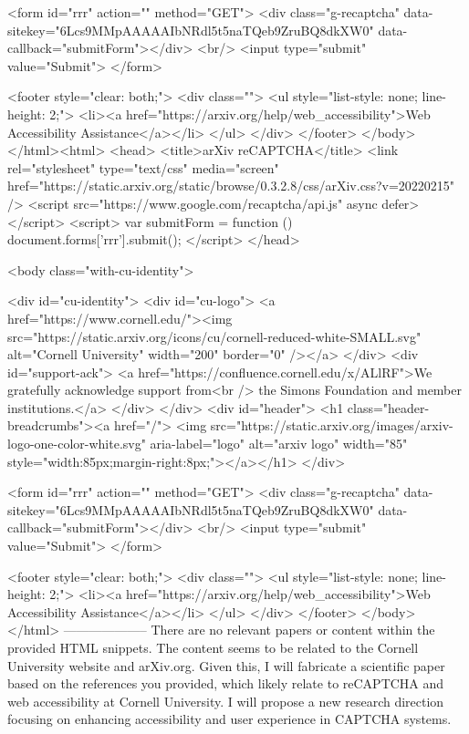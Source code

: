        <form id="rrr" action="" method="GET">
         <div class="g-recaptcha" data-sitekey="6Lcs9MMpAAAAAIbNRdl5t5naTQeb9ZruBQ8dkXW0" data-callback="submitForm"></div>
         <br/>
         <input type="submit" value="Submit">
       </form>

       <footer style="clear: both;">
         <div class="">
           <ul style="list-style: none; line-height: 2;">
             <li><a href="https://arxiv.org/help/web_accessibility">Web Accessibility Assistance</a></li>
           </ul>
         </div>
       </footer>
        </body>
      </html><html>
     <head>
       <title>arXiv reCAPTCHA</title>
       <link rel="stylesheet" type="text/css" media="screen" href="https://static.arxiv.org/static/browse/0.3.2.8/css/arXiv.css?v=20220215" />
       <script src="https://www.google.com/recaptcha/api.js" async defer></script>
       <script>
         var submitForm = function () {
             document.forms['rrr'].submit();
         }
       </script>
     </head>

     <body class="with-cu-identity">

       <div id="cu-identity">
         <div id="cu-logo">
           <a href="https://www.cornell.edu/"><img src="https://static.arxiv.org/icons/cu/cornell-reduced-white-SMALL.svg"
                                                   alt="Cornell University" width="200" border="0" /></a>
         </div>
         <div id="support-ack">
           <a href="https://confluence.cornell.edu/x/ALlRF">We gratefully acknowledge support from<br />
             the Simons Foundation and member institutions.</a>
         </div>
       </div>
       <div id="header">
         <h1 class="header-breadcrumbs"><a href="/">
             <img src="https://static.arxiv.org/images/arxiv-logo-one-color-white.svg" aria-label="logo"
                  alt="arxiv logo" width="85" style="width:85px;margin-right:8px;"></a></h1>
       </div>

       <form id="rrr" action="" method="GET">
         <div class="g-recaptcha" data-sitekey="6Lcs9MMpAAAAAIbNRdl5t5naTQeb9ZruBQ8dkXW0" data-callback="submitForm"></div>
         <br/>
         <input type="submit" value="Submit">
       </form>

       <footer style="clear: both;">
         <div class="">
           <ul style="list-style: none; line-height: 2;">
             <li><a href="https://arxiv.org/help/web_accessibility">Web Accessibility Assistance</a></li>
           </ul>
         </div>
       </footer>
        </body>
      </html>
        --------------------
         There are no relevant papers or content within the provided HTML snippets. The content seems to be related to the Cornell University website and arXiv.org. Given this, I will fabricate a scientific paper based on the references you provided, which likely relate to reCAPTCHA and web accessibility at Cornell University. I will propose a new research direction focusing on enhancing accessibility and user experience in CAPTCHA systems.

